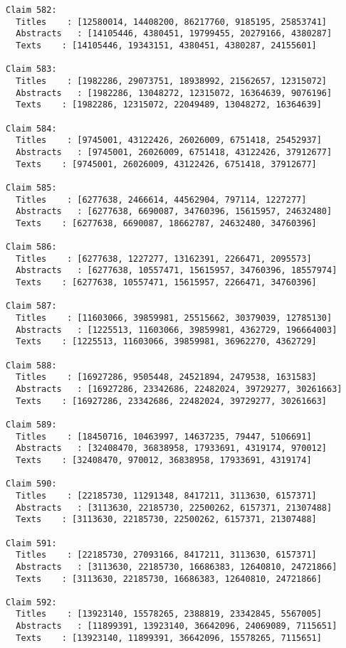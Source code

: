 \documentclass[11pt]{article}
\begin{document}
\begin{Verbatim}[commandchars=\\\{\}]
Claim 582:
  Titles    : [12580014, 14408200, 86217760, 9185195, 25853741]
  Abstracts   : [14105446, 4380451, 19799455, 20279166, 4380287]
  Texts    : [14105446, 19343151, 4380451, 4380287, 24155601]

Claim 583:
  Titles    : [1982286, 29073751, 18938992, 21562657, 12315072]
  Abstracts   : [1982286, 13048272, 12315072, 16364639, 9076196]
  Texts    : [1982286, 12315072, 22049489, 13048272, 16364639]

Claim 584:
  Titles    : [9745001, 43122426, 26026009, 6751418, 25452937]
  Abstracts   : [9745001, 26026009, 6751418, 43122426, 37912677]
  Texts    : [9745001, 26026009, 43122426, 6751418, 37912677]

Claim 585:
  Titles    : [6277638, 2466614, 44562904, 797114, 1227277]
  Abstracts   : [6277638, 6690087, 34760396, 15615957, 24632480]
  Texts    : [6277638, 6690087, 18662787, 24632480, 34760396]

Claim 586:
  Titles    : [6277638, 1227277, 13162391, 2266471, 2095573]
  Abstracts   : [6277638, 10557471, 15615957, 34760396, 18557974]
  Texts    : [6277638, 10557471, 15615957, 2266471, 34760396]

Claim 587:
  Titles    : [11603066, 39859981, 25515662, 30379039, 12785130]
  Abstracts   : [1225513, 11603066, 39859981, 4362729, 196664003]
  Texts    : [1225513, 11603066, 39859981, 36962270, 4362729]

Claim 588:
  Titles    : [16927286, 9505448, 24521894, 2479538, 1631583]
  Abstracts   : [16927286, 23342686, 22482024, 39729277, 30261663]
  Texts    : [16927286, 23342686, 22482024, 39729277, 30261663]

Claim 589:
  Titles    : [18450716, 10463997, 14637235, 79447, 5106691]
  Abstracts   : [32408470, 36838958, 17933691, 4319174, 970012]
  Texts    : [32408470, 970012, 36838958, 17933691, 4319174]

Claim 590:
  Titles    : [22185730, 11291348, 8417211, 3113630, 6157371]
  Abstracts   : [3113630, 22185730, 22500262, 6157371, 21307488]
  Texts    : [3113630, 22185730, 22500262, 6157371, 21307488]

Claim 591:
  Titles    : [22185730, 27093166, 8417211, 3113630, 6157371]
  Abstracts   : [3113630, 22185730, 16686383, 12640810, 24721866]
  Texts    : [3113630, 22185730, 16686383, 12640810, 24721866]

Claim 592:
  Titles    : [13923140, 15578265, 2388819, 23342845, 5567005]
  Abstracts   : [11899391, 13923140, 36642096, 24069089, 7115651]
  Texts    : [13923140, 11899391, 36642096, 15578265, 7115651]


\end{Verbatim}
\end{document}
